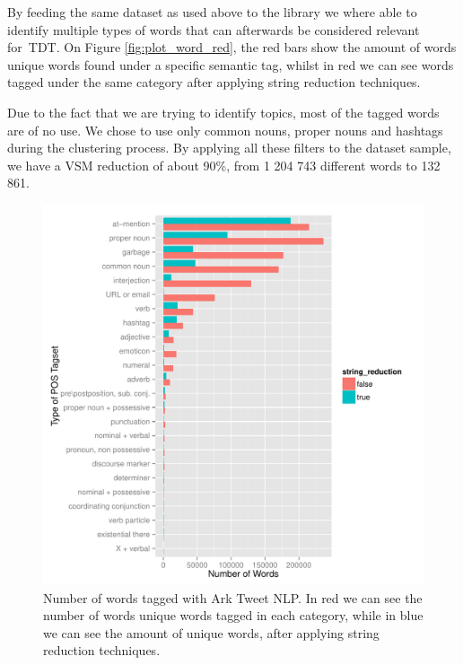 By feeding the same dataset as used above to the library we where able to identify multiple types of words that can afterwards be considered relevant for~\ac{TDT}. On Figure \ref{fig:plot_word_red}, the red bars show the amount of words unique words found under a specific semantic tag, whilst in red we can see words tagged under the same category after applying string reduction techniques.

Due to the fact that we are trying to identify topics, most of the tagged words are of no use. We chose to use only common nouns, proper nouns and hashtags during the clustering process. By applying all these filters to the dataset sample, we have a \ac{VSM} reduction of about 90\%, from 1 204 743 different words to 132 861.

\begin{figure}[htpb]
  \centering
  \includegraphics[width=0.8\linewidth]{./plots/svm/plot_wordcount_nlp.pdf}
  \caption{Number of words tagged with Ark Tweet NLP. In red we can see the number of words unique words tagged in each category, while in blue we can see the amount of unique words, after applying string reduction techniques.}
  \label{fig:wordcount_nlp}
\end{figure}

